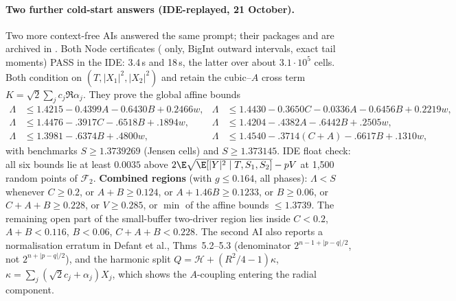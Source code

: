 \paragraph{Two further cold-start answers (IDE-replayed, 21 October).} Two more context-free AIs answered the same prompt; their packages
 and  are archived in . Both Node certificates
( only, BigInt outward intervals, exact tail moments) PASS in the IDE: 3.4\,s and 18\,s, the latter over about $3.1\cdot10^5$ cells. Both condition on
$(T,|X_1|^2,|X_2|^2)$ and retain the cubic--$A$ cross term $K=\sqrt2\sum_jc_j\Re\alpha_j$. They prove the global affine bounds
\[
\begin{aligned}
\Lambda&\le1.4215-0.4399A-0.6430B+0.2466w, &\Lambda&\le1.4430-0.3650C-0.0336A-0.6456B+0.2219w,\\
\Lambda&\le1.4476-.3917C-.6518B+.1894w, &\Lambda&\le1.4204-.4382A-.6442B+.2505w,\\
\Lambda&\le1.3981-.6374B+.4800w, &\Lambda&\le1.4540-.3714(C+A)-.6617B+.1310w,
\end{aligned}
\]
with benchmarks $S\ge1.3739269$ (Jensen cells) and $S\ge1.373145$. IDE float check: all six bounds lie at least $0.0035$ above
$2\E\sqrt{\E[|Y|^2\mid T,S_1,S_2]}-pV$ at 1{,}500 random points of $\mathcal F_2$. \textbf{Combined regions} (with $g\le0.164$, all phases): $\Lambda<S$ whenever
$C\ge0.2$, or $A+B\ge0.124$, or $A+1.46B\ge0.1233$, or $B\ge0.06$, or $C+A+B\ge0.228$, or $V\ge0.285$, or $\min$ of the affine bounds $\le1.3739$. The remaining open
part of the small-buffer two-driver region lies inside $C<0.2$, $A+B<0.116$, $B<0.06$, $C+A+B<0.228$. The second AI also reports a normalisation erratum in
Defant et al., Thms~5.2--5.3 (denominator $2^{n-1+|p-q|/2}$, not $2^{n+|p-q|/2}$), and the harmonic split $Q=\mathcal H+(R^2/4-1)\kappa$,
$\kappa=\sum_j(\sqrt2c_j+\alpha_j)X_j$, which shows the $A$-coupling entering the radial component.


